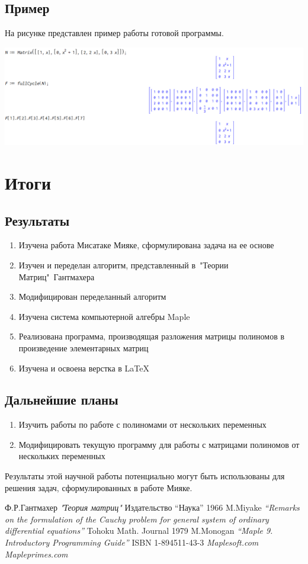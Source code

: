 \documentclass[12pt]{extreport}
\begin{document}
		\section{Пример}
		На рисунке представлен пример работы готовой программы.\\
		\begin{center}
			\includegraphics[width=\textwidth]{example.png}	
		\end{center}
	\chapter{Итоги}
	\section{Результаты}
	\begin{enumerate}
		\item Изучена работа \cite{miyake} Мисатаке Мияке, сформулирована задача на ее основе
		\item Изучен и переделан алгоритм, представленный в\ "Теории Матриц"\ Гантмахера \cite{gantmaher}
		\item Модифицирован переделанный алгоритм
		\item Изучена система компьютерной алгебры Maple
		\item Реализована программа, производящая разложения матрицы полиномов в
		произведение элементарных матриц
		\item Изучена и освоена верстка в LaTeX
	\end{enumerate}
	\section{Дальнейшие планы}
	\begin{enumerate}
		\item Изучить работы по работе с полиномами от нескольких переменных
		\item Модифицировать текущую программу для работы с матрицами полиномов 
		от нескольких переменных
	\end{enumerate}
	Результаты этой научной работы потенциально могут быть использованы
	для решения задач, сформулированных в работе \cite{miyake} Мияке.
	\begin{thebibliography}{5}
			Ф.Р.Гантмахер
			\textit{"Теория матриц"}
			Издательство “Наука” 1966		
			M.Miyake
			\textit{“Remarks on the formulation of the Cauchy problem 
			for general system of ordinary differential equations”}
			Tohoku Math. Journal 1979		
			M.Monogan
			\textit{“Maple 9. Introductory Programming Guide”}
			ISBN 1-894511-43-3			
			\textit{Maplesoft.com}		
			\textit{Mapleprimes.com}		
	\end{thebibliography}
\end{document}
